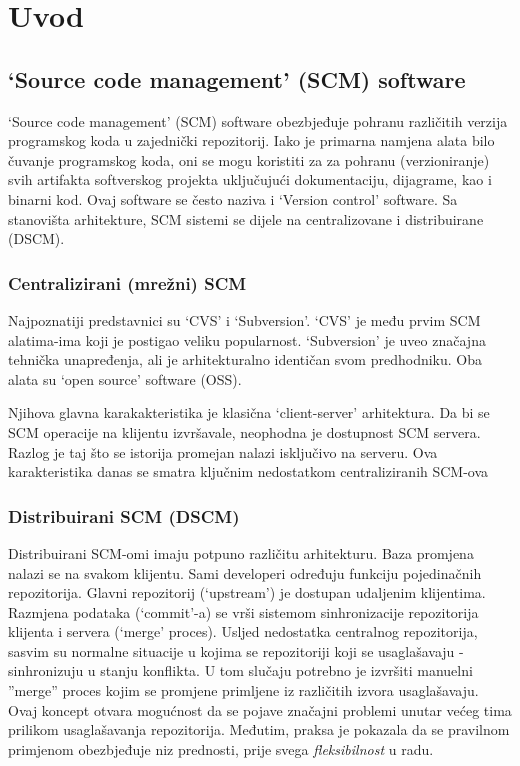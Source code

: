 \documentclass[times, utf8, seminar]{fit}
\begin{document}

\chapter{Uvod}
\vspace*{-0.7cm}

\section{`Source code management' (SCM) software}

`Source code management' (SCM) software obezbjeđuje pohranu različitih verzija programskog koda u zajednički repozitorij. 
Iako je primarna namjena alata bilo čuvanje programskog koda, oni se mogu koristiti za za pohranu (verzioniranje) svih artifakta softverskog projekta uključujući dokumentaciju, dijagrame, kao i  binarni kod. Ovaj software se često naziva i `Version control' software.
Sa stanovišta arhitekture, SCM sistemi se dijele na centralizovane i distribuirane (DSCM).

\subsection{Centralizirani (mrežni) SCM}

Najpoznatiji predstavnici su `CVS' i `Subversion'. `CVS' je među prvim SCM alatima-ima koji je postigao veliku popularnost. `Subversion' je uveo značajna tehnička unapređenja, ali je arhitekturalno identičan svom predhodniku. Oba alata su `open source' software (OSS).

Njihova glavna karakakteristika je klasična `client-server' arhitektura. Da bi se SCM operacije na klijentu izvršavale, neophodna je dostupnost SCM servera.
Razlog je taj što se istorija promejan nalazi isključivo na serveru. Ova karakteristika danas se smatra ključnim nedostatkom centraliziranih SCM-ova

\subsection{Distribuirani SCM (DSCM)}

Distribuirani SCM-omi imaju potpuno različitu arhitekturu. Baza promjena nalazi se na svakom klijentu.
Sami developeri određuju funkciju pojedinačnih repozitorija. Glavni repozitorij (`upstream') je dostupan udaljenim klijentima.
Razmjena podataka (`commit'-a) se vrši sistemom sinhronizacije repozitorija klijenta i servera (`merge' proces). 
Usljed nedostatka centralnog repozitorija, sasvim su normalne situacije u kojima se repozitoriji koji se usaglašavaju - sinhronizuju u stanju konflikta.
U tom slučaju potrebno je izvršiti manuelni ''merge'' proces kojim se promjene primljene iz različitih izvora usaglašavaju.
Ovaj koncept otvara mogućnost da se pojave značajni problemi unutar većeg tima prilikom usaglašavanja repozitorija. Međutim, praksa je pokazala da se pravilnom primjenom obezbjeđuje niz prednosti, prije svega \emph{fleksibilnost} u radu.
\end{document}
